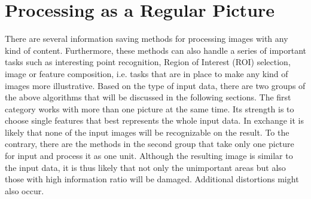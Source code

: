 \documentclass[draft,final]{vutinfth} %
\begin{document}
	\section{Processing as a Regular Picture}
	There are several information saving methods for processing images with any kind of content.
	Furthermore, these methods can also handle a series of important tasks such as interesting point recognition, Region of Interest (ROI) selection, image or feature composition, i.e. tasks that are in place to make any kind of images more illustrative.
	Based on the type of input data, there are two groups of the above algorithms that will be discussed in the following sections.
	The first category works with more than one picture at the same time.
	Its strength is to choose single features that best represents the whole input data. 
	In exchange it is likely that none of the input images will be recognizable on the result.
	To the contrary, there are the methods in the second group that take only one picture for input and process it as one unit.
	Although the resulting image is similar to the input data, it is thus likely that not only the unimportant areas but also those with high information ratio will be damaged. 
	Additional distortions might also occur.
	
	
\end{document}
